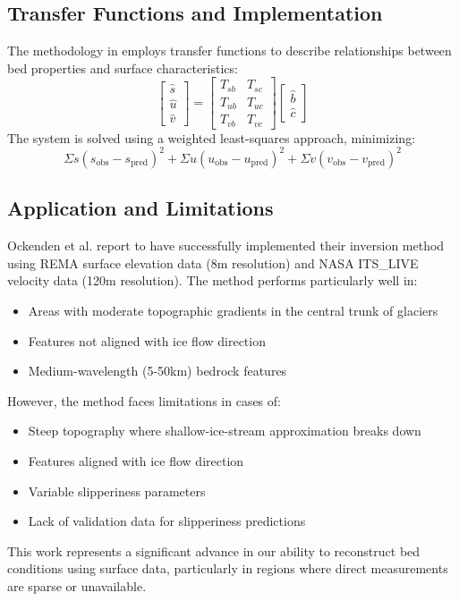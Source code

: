 \subsection*{Transfer Functions and Implementation}

The methodology in \cite{Ockenden_2022} employs transfer functions to describe relationships between bed properties and surface characteristics:
$$\begin{bmatrix}
\hat{s} \\
\hat{u} \\
\hat{v}
\end{bmatrix} =\begin{bmatrix}
T_{sb} & T_{sc} \\
T_{ub} & T_{uc} \\
T_{vb} & T_{vc}
\end{bmatrix}
\begin{bmatrix}
\hat{b}\\
\hat{c}
\end{bmatrix}$$
The system is solved using a weighted least-squares approach, minimizing:
\begin{equation}
\Sigma s(s_{\mathrm{obs}} - s_{\mathrm{pred}})^2 + \Sigma u(u_{\mathrm{obs}} - u_{\mathrm{pred}})^2 + \Sigma v(v_{\mathrm{obs}} - v_{\mathrm{pred}})^2
\end{equation}

\subsection*{Application and Limitations}

Ockenden et al. report to have successfully implemented their inversion method using REMA surface elevation data (8m resolution) and NASA ITS\_LIVE velocity data (120m resolution). The method performs particularly well in:
\begin{itemize}
\item Areas with moderate topographic gradients in the central trunk of glaciers
\item Features not aligned with ice flow direction
\item Medium-wavelength (5-50km) bedrock features
\end{itemize}
However, the method faces limitations in cases of:
\begin{itemize}
\item Steep topography where shallow-ice-stream approximation breaks down
\item Features aligned with ice flow direction
\item Variable slipperiness parameters
\item Lack of validation data for slipperiness predictions
\end{itemize}
This work represents a significant advance in our ability to reconstruct bed conditions using surface data, particularly in regions where direct measurements are sparse or unavailable.


